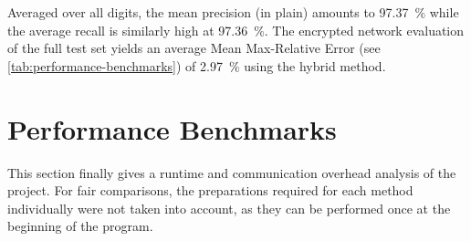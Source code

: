 Averaged over all digits, the mean precision (in plain) amounts to \SI{97.37}{\percent} while the average recall is similarly high at \SI{97.36}{\percent}.
The encrypted network evaluation of the full test set yields an average Mean Max-Relative Error (see \cref{tab:performance-benchmarks}) of \SI{2.97}{\percent} using the hybrid method.

\section{Performance Benchmarks}
\label{sec:performance-benchmarks}
This section finally gives a runtime and communication overhead analysis of the project.
For fair comparisons, the preparations required for each method individually were not taken into account, as they can be performed once at the beginning of the program.

